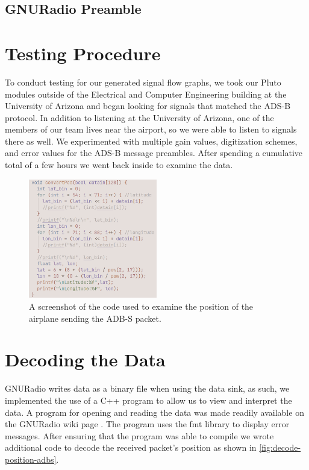 \documentclass[journal, onecolumn]{IEEEtran}
\begin{document}
\subsection{GNURadio Preamble}


\section{Testing Procedure}
To conduct testing for our generated signal flow graphs, we took our Pluto modules outside of the Electrical and Computer Engineering building at the University of Arizona and began looking for signals that matched the ADS-B protocol.
In addition to listening at the University of Arizona, one of the members of our team lives near the airport, so we were able to listen to signals there as well. 
We experimented with multiple gain values, digitization schemes, and error values for the ADS-B message preambles. 
After spending a cumulative total of a few hours we went back inside to examine the data.

\begin{figure}
  \begin{center}
    \includegraphics[width=0.5\textwidth]{./figures/fig_decode_position.png}
  \end{center}
  \caption{A screenshot of the code used to examine the position of the airplane sending the ADB-S packet.}\label{fig:decode-position-adbs}
\end{figure}

\section{Decoding the Data}
GNURadio writes data as a binary file when using the data sink, as such, we implemented the use of a C++ program to allow us to view and interpret the data. A program for opening and reading the data was made readily available on the GNURadio wiki page \cite{gnuradio-reading-file-cpp}. 
The program uses the fmt library\cite{fmt-library} to display error messages.
After ensuring that the program was able to compile we wrote additional code to decode the received packet's position as shown in \autoref{fig:decode-position-adbs}.
\end{document}
